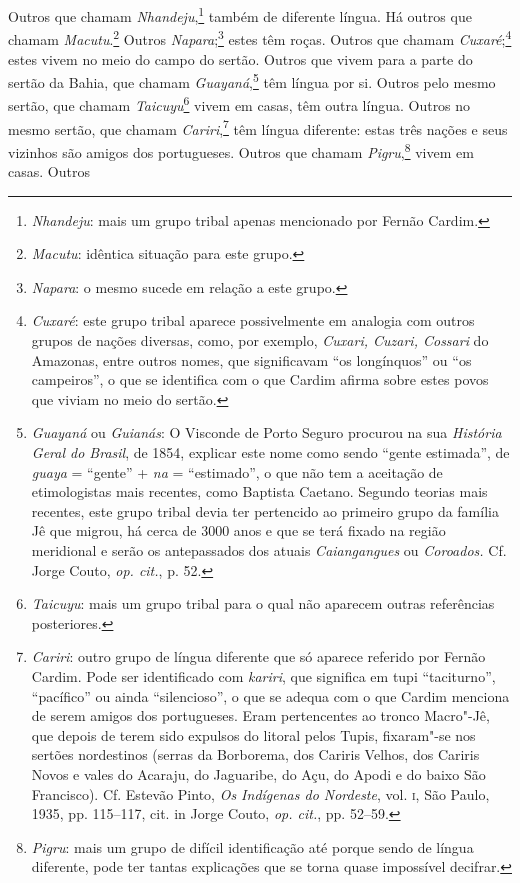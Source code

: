  Outros que chamam \textit{Nhandeju},\footnote{ \textit{Nhandeju}: 
mais um grupo tribal apenas mencionado por Fernão Cardim.} 
também de diferente língua. Há outros que chamam 
\textit{Macutu}.\footnote{ \textit{Macutu}: idêntica situação para este
grupo.} Outros \textit{Napara};\footnote{ \textit{Napara}: o
mesmo sucede em relação a este grupo.} estes têm roças. Outros
que chamam \textit{Cuxaré};\footnote{ \textit{Cuxaré}: este grupo
tribal aparece possivelmente em analogia com outros grupos de nações
diversas, como, por exemplo, \textit{Cuxari, Cuzari, Cossari} do
Amazonas, entre outros nomes, que significavam ``os longínquos'' ou ``os
campeiros'', o que se identifica com o que Cardim afirma sobre estes
povos que viviam no meio do sertão.} estes vivem no meio do
campo do sertão. Outros que vivem para a parte do sertão da Bahia, que
chamam \textit{Guayaná},\footnote{ \textit{Guayaná} ou \textit{Guianás}: 
O Visconde de Porto Seguro procurou na sua \textit{História Geral
do Brasil}, de 1854, explicar este nome como sendo ``gente estimada'', de
\textit{guaya} = ``gente'' + \textit{na} = ``estimado'', o que não tem a
aceitação de etimologistas mais recentes, como Baptista Caetano.
Segundo teorias mais recentes, este grupo tribal devia ter pertencido ao
primeiro grupo da família Jê que migrou, há cerca de 3000 anos e que se
terá fixado na região meridional e serão os antepassados dos atuais
\textit{Caiangangues} ou \textit{Coroados.} Cf. Jorge Couto,
\textit{op. cit.}, p. 52.} têm língua por si. Outros
pelo mesmo sertão, que chamam \textit{Taicuyu}\footnote{ \textit{Taicuyu}: 
mais um grupo tribal para o qual não aparecem outras
referências posteriores.} vivem em casas, têm outra língua.
Outros no mesmo sertão, que chamam \textit{Cariri},\footnote{ \textit{Cariri}: 
outro grupo de língua diferente que só aparece
referido por Fernão Cardim. Pode ser identificado com \textit{kariri}, 
que significa em tupi ``taciturno'', ``pacífico'' ou ainda ``silencioso'',
o que se adequa com o que Cardim menciona de serem amigos dos
portugueses. Eram pertencentes ao tronco Macro"-Jê, que depois de terem
sido expulsos do litoral pelos Tupis, fixaram"-se nos sertões
nordestinos (serras da Borborema, dos Cariris Velhos, dos Cariris Novos
e vales do Acaraju, do Jaguaribe, do Açu, do Apodi e do baixo São
Francisco). Cf. Estevão Pinto, \textit{Os Indígenas do Nordeste}, vol.
\textsc{i}, São Paulo, 1935, pp. 115--117, cit. in Jorge Couto, \textit{op. cit.}, 
pp. 52--59.} têm língua diferente: estas três nações e seus
vizinhos são amigos dos portugueses. Outros que chamam \textit{Pigru},\footnote{ \textit{Pigru}: 
mais um grupo de difícil identificação
até porque sendo de língua diferente, pode ter tantas explicações que
se torna quase impossível decifrar.} vivem em casas. Outros
